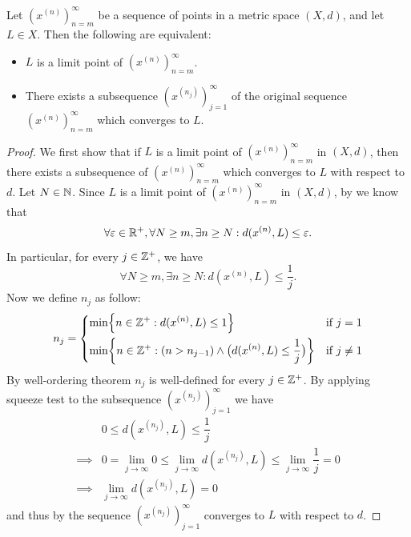 \begin{prop}\label{ii:1.4.5}
  Let \((x^{(n)})_{n = m}^\infty\) be a sequence of points in a metric space \((X, d)\), and let \(L \in X\).
  Then the following are equivalent:
  \begin{itemize}
    \item \(L\) is a limit point of \((x^{(n)})_{n = m}^\infty\).
    \item There exists a subsequence \((x^{(n_j)})_{j = 1}^\infty\) of the original sequence \((x^{(n)})_{n = m}^\infty\) which converges to \(L\).
  \end{itemize}
\end{prop}

\begin{proof}
  We first show that if \(L\) is a limit point of \((x^{(n)})_{n = m}^\infty\) in \((X, d)\), then there exists a subsequence of \((x^{(n)})_{n = m}^\infty\) which converges to \(L\) with respect to \(d\).
  Let \(N \in \mathbb{N}\).
  Since \(L\) is a limit point of \((x^{(n)})_{n = m}^\infty\) in \((X, d)\), by  we know that
  \[
    \forall \varepsilon \in \mathbb{R}^+, \forall N \geq m, \exists n \geq N : d(x^{(n)}, L) \leq \varepsilon.
  \]
  In particular, for every \(j \in \mathbb{Z}^+\), we have
  \[
    \forall N \geq m, \exists n \geq N : d(x^{(n)}, L) \leq \dfrac{1}{j}.
  \]
  Now we define \(n_j\) as follow:
  \[
    n_j = \begin{dcases}
      \min\set{n \in \Z^+ : d(x^{(n)}, L) \leq 1}                                            & \text{if } j = 1    \\
      \min\set{n \in \Z^+ : (n > n_{j - 1}) \land \big(d(x^{(n)}, L) \leq \dfrac{1}{j}\big)} & \text{if } j \neq 1
    \end{dcases}
  \]
  By well-ordering theorem \(n_j\) is well-defined for every \(j \in \mathbb{Z}^+\).
  By applying squeeze test to the subsequence \((x^{(n_j)})_{j = 1}^\infty\) we have
  \begin{align*}
             & 0 \leq d(x^{(n_j)}, L) \leq \dfrac{1}{j}                                                                     \\
    \implies & 0 = \lim_{j \to \infty} 0 \leq \lim_{j \to \infty} d(x^{(n_j)}, L) \leq \lim_{j \to \infty} \dfrac{1}{j} = 0 \\
    \implies & \lim_{j \to \infty} d(x^{(n_j)}, L) = 0
  \end{align*}
  and thus by  the sequence \((x^{(n_j)})_{j = 1}^\infty\) converges to \(L\) with respect to \(d\).


\end{proof}
